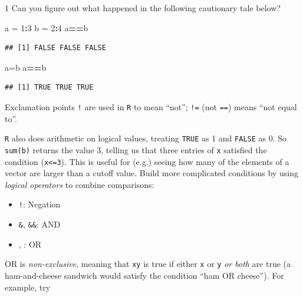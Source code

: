\documentclass[11pt,]{article}
\newenvironment{Shaded}{\begin{snugshade}}{\end{snugshade}}
\newcommand{\DecValTok}[1]{\textcolor[rgb]{0.00,0.00,0.81}{#1}}
\newcommand{\NormalTok}[1]{#1}
\newcommand{\OperatorTok}[1]{\textcolor[rgb]{0.81,0.36,0.00}{\textbf{#1}}}
\newcommand{\StringTok}[1]{\textcolor[rgb]{0.31,0.60,0.02}{#1}}
\providecommand{\tightlist}{%
  \setlength{\itemsep}{0pt}\setlength{\parskip}{0pt}}
\let\BeginKnitrBlock\begin \let\EndKnitrBlock\end
\begin{document}
\BeginKnitrBlock{exercisebox}{1}
Can you figure out what happened in the following cautionary tale below?
\EndKnitrBlock{exercisebox}

\begin{Shaded}
\begin{Highlighting}[]
\NormalTok{a =}\StringTok{ }\DecValTok{1}\OperatorTok{:}\DecValTok{3}
\NormalTok{b =}\StringTok{ }\DecValTok{2}\OperatorTok{:}\DecValTok{4}
\NormalTok{a}\OperatorTok{==}\NormalTok{b}
\end{Highlighting}
\end{Shaded}

\begin{verbatim}
## [1] FALSE FALSE FALSE
\end{verbatim}

\begin{Shaded}
\begin{Highlighting}[]
\NormalTok{a=b}
\NormalTok{a}\OperatorTok{==}\NormalTok{b}
\end{Highlighting}
\end{Shaded}

\begin{verbatim}
## [1] TRUE TRUE TRUE
\end{verbatim}

Exclamation points \texttt{!} are used in \texttt{R} to mean ``not''; \texttt{!=} (not \texttt{==}) means ``not equal to''.

\texttt{R} also does arithmetic on logical values, treating \texttt{TRUE} as 1 and \texttt{FALSE} as 0. So \texttt{sum(b)} returns the value 3, telling us that three entries of \texttt{x} satisfied the condition (\texttt{x\textless{}=3}). This is useful for (e.g.) seeing how many of the elements of a vector are larger than a cutoff value. Build more complicated conditions by using \emph{logical operators} to combine comparisons:

\begin{itemize}
\tightlist
\item
  \texttt{!}: Negation
\item
  \texttt{\&}, \texttt{\&\&}: AND
\item
  \texttt{\textbar{}}, \texttt{\textbar{}\textbar{}}: OR
\end{itemize}

OR is \emph{non-exclusive}, meaning that \texttt{x\textbar{}y} is true if either \texttt{x} or \texttt{y} \emph{or both} are true (a ham-and-cheese sandwich would satisfy the condition ``ham OR cheese''). For example, try
\end{document}
